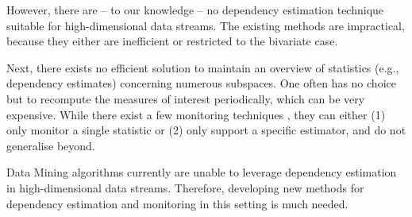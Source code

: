 However, there are -- to our knowledge -- no dependency estimation technique suitable for high-dimensional data streams. The existing methods are impractical, because they either are inefficient or restricted to the bivariate case. 

Next, there exists no efficient solution to maintain an overview of statistics (e.g., dependency estimates) concerning numerous subspaces. One often has no choice but to recompute the measures of interest periodically, which can be very expensive. While there exist a few monitoring techniques \cite{DBLP:conf/vldb/ZhuS02, DBLP:conf/sdm/BifetG07}, they can either (1) only monitor a single statistic or (2) only support a specific estimator, and do not generalise beyond. 

Data Mining algorithms currently are unable to leverage dependency estimation in high-dimensional data streams. Therefore, developing new methods for dependency estimation and monitoring in this setting is much needed.


